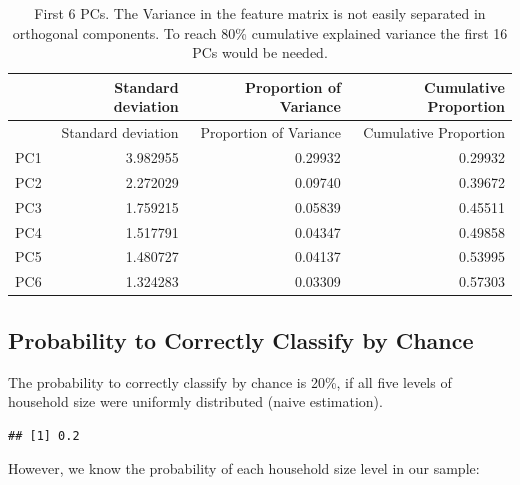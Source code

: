 \documentclass[]{article}
\newenvironment{Shaded}{\begin{snugshade}}{\end{snugshade}}
\newcommand{\ControlFlowTok}[1]{\textcolor[rgb]{0.13,0.29,0.53}{\textbf{#1}}}
\newcommand{\DataTypeTok}[1]{\textcolor[rgb]{0.13,0.29,0.53}{#1}}
\newcommand{\DecValTok}[1]{\textcolor[rgb]{0.00,0.00,0.81}{#1}}
\newcommand{\KeywordTok}[1]{\textcolor[rgb]{0.13,0.29,0.53}{\textbf{#1}}}
\newcommand{\NormalTok}[1]{#1}
\newcommand{\OperatorTok}[1]{\textcolor[rgb]{0.81,0.36,0.00}{\textbf{#1}}}
\newcommand{\OtherTok}[1]{\textcolor[rgb]{0.56,0.35,0.01}{#1}}
\newcommand{\StringTok}[1]{\textcolor[rgb]{0.31,0.60,0.02}{#1}}
\begin{document}
\begin{longtable}[]{@{}lrrr@{}}
\caption{\label{tab:tab5} First 6 PCs. The Variance in the feature
matrix is not easily separated in orthogonal components. To reach 80\%
cumulative explained variance the first 16 PCs would be
needed.}\tabularnewline
\toprule
& Standard deviation & Proportion of Variance & Cumulative
Proportion\tabularnewline
\midrule
\endfirsthead
\toprule
& Standard deviation & Proportion of Variance & Cumulative
Proportion\tabularnewline
\midrule
\endhead
PC1 & 3.982955 & 0.29932 & 0.29932\tabularnewline
PC2 & 2.272029 & 0.09740 & 0.39672\tabularnewline
PC3 & 1.759215 & 0.05839 & 0.45511\tabularnewline
PC4 & 1.517791 & 0.04347 & 0.49858\tabularnewline
PC5 & 1.480727 & 0.04137 & 0.53995\tabularnewline
PC6 & 1.324283 & 0.03309 & 0.57303\tabularnewline
\bottomrule
\end{longtable}

\hypertarget{probability-to-correctly-classify-by-chance}{%
\subsection{Probability to Correctly Classify by
Chance}\label{probability-to-correctly-classify-by-chance}}

The probability to correctly classify by chance is 20\%, if all five
levels of household size were uniformly distributed (naive estimation).

\begin{Shaded}
\end{Shaded}

\begin{verbatim}
## [1] 0.2
\end{verbatim}

However, we know the probability of each household size level in our
sample:
\end{document}
